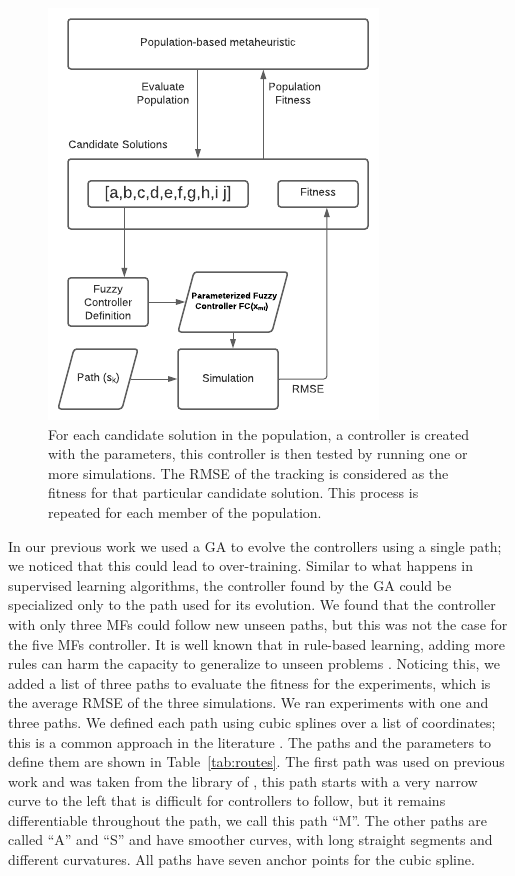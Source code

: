 \documentclass[symmetry,article,submit,moreauthors,pdftex]{Definitions/mdpi}
\begin{document}
\begin{figure}[H]
\centering
\includegraphics[width=9 cm]{img/ga}
\caption{
For each candidate solution in the population, a controller is created with the
parameters, this controller is then tested by running one or more simulations.
The RMSE of the tracking is considered as the fitness for that particular
candidate solution. This process is repeated for each member of the
population.
}\label{fig:ga}
\end{figure} 

In our previous work \cite{Mancilla2021} we used a GA to evolve the controllers 
using a single path; we noticed that this could lead to over-training. Similar to what
happens in supervised learning algorithms, the controller found by the GA could
be specialized only to the path used for its evolution. We found that the
controller with only three MFs could follow new unseen paths, but this was not
the case for the five MFs controller. It is well known that in rule-based
learning, adding more rules can harm the capacity to generalize to unseen
problems \cite{tan2016introduction}. Noticing this, we added a list of three
paths to evaluate the fitness for the experiments, which is the average RMSE
of the three simulations. We ran experiments with one and three paths. We
defined each path using cubic splines over a list of coordinates; this is a
common approach in the literature \cite{zhang2013cubic}. The paths and the
parameters to define them are shown in Table~\ref{tab:routes}. The first path
was used on previous work and was taken from the library of
\cite{sakai_pythonrobotics_2018}, this path starts with a very narrow curve to
the left that is difficult for controllers to follow, but it remains
differentiable throughout the path, we call this path ``M''. The other paths
are called ``A'' and ``S'' and have smoother curves, with long straight
segments and different curvatures. All paths have seven anchor points for the
cubic spline.
\end{document}
